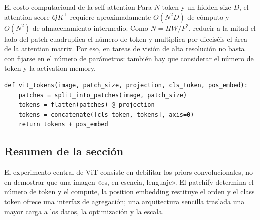 \begin{importantbox}{El costo computacional de la self-attention}
Para $N$ token y un hidden size $D$, el attention score $QK^{\top}$ requiere aproximadamente $O(N^2D)$ de cómputo y $O(N^2)$ de almacenamiento intermedio. Como $N=HW/P^2$, reducir a la mitad el lado del patch cuadruplica el número de token y multiplica por dieciséis el área de la attention matrix. Por eso, en tareas de visión de alta resolución no basta con fijarse en el número de parámetros: también hay que considerar el número de token y la activation memory.
\end{importantbox}

\begin{lstlisting}[caption={Patchify and prepend a class token}]
def vit_tokens(image, patch_size, projection, cls_token, pos_embed):
    patches = split_into_patches(image, patch_size)
    tokens = flatten(patches) @ projection
    tokens = concatenate([cls_token, tokens], axis=0)
    return tokens + pos_embed
\end{lstlisting}

\subsection{Resumen de la sección}

El experimento central de ViT consiste en debilitar los priors convolucionales, no en demostrar que una imagen «es, en esencia, lenguaje». El patchify determina el número de token y el compute, la position embedding restituye el orden y el class token ofrece una interfaz de agregación; una arquitectura sencilla traslada una mayor carga a los datos, la optimización y la escala.
